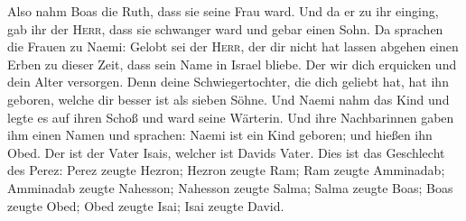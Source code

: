  Also nahm Boas die Ruth, dass sie seine Frau ward. Und
da er zu ihr einging, gab ihr der \textsc{Herr}, dass sie schwanger ward
und gebar einen Sohn.  Da sprachen die Frauen zu Naemi:
Gelobt sei der \textsc{Herr}, der dir nicht hat lassen abgehen einen
Erben zu dieser Zeit, dass sein Name in Israel bliebe. 
Der wir dich erquicken und dein Alter versorgen. Denn deine
Schwiegertochter, die dich geliebt hat, hat ihn geboren, welche dir
besser ist als sieben Söhne.  Und Naemi nahm das Kind und
legte es auf ihren Schoß und ward seine Wärterin.  Und
ihre Nachbarinnen gaben ihm einen Namen und sprachen: Naemi ist ein Kind
geboren; und hießen ihn Obed. Der ist der Vater Isais, welcher ist
Davids Vater.  Dies ist das Geschlecht des Perez: Perez
zeugte Hezron;  Hezron zeugte Ram; Ram zeugte Amminadab;
 Amminadab zeugte Nahesson; Nahesson zeugte Salma;
 Salma zeugte Boas; Boas zeugte Obed; 
Obed zeugte Isai; Isai zeugte David.
